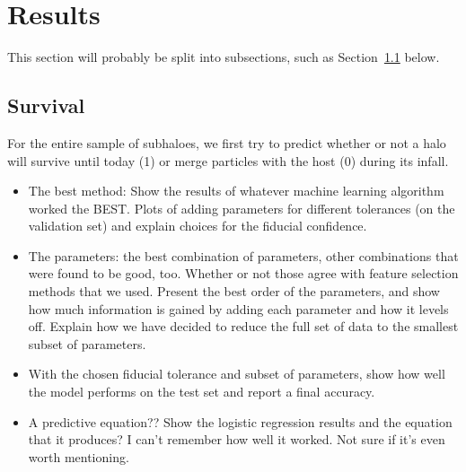 \documentclass[fleqn,usenatbib]{mnras}
\begin{document}
\section{Results}
This section will probably be split into subsections, such as Section~\ref{sec:survival} below.

\subsection{Survival}
\label{sec:survival} %

For the entire sample of subhaloes, we first try to predict whether or not a halo will survive until today (1) or merge particles with the host (0) during its infall.
\begin{itemize}
		\item The best method: Show the results of whatever machine learning algorithm worked the BEST. Plots of adding parameters for different tolerances (on the validation set) and explain choices for the fiducial confidence.
	\item The parameters: the best combination of parameters, other combinations that were found to be good, too. Whether or not those agree with feature selection methods that we used. Present the best order of the parameters, and show how much information is gained by adding each parameter and how it levels off. Explain how we have decided to reduce the full set of data to the smallest subset of parameters.
    \item With the chosen fiducial tolerance and subset of parameters, show how well the model performs on the test set and report a final accuracy.
    \item A predictive equation?? Show the logistic regression results and the equation that it produces? I can't remember how well it worked. Not sure if it's even worth mentioning.
\end{itemize}
\end{document}
